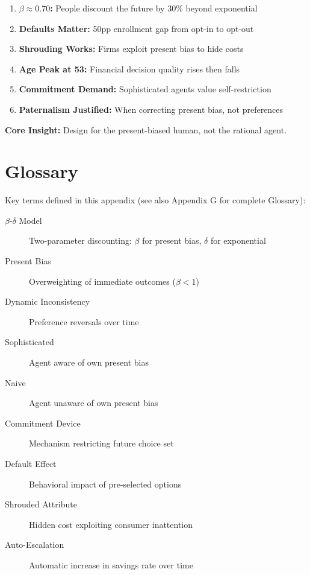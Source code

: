 \begin{tcolorbox}[colback=gray!10!white,colframe=gray!50!black,title=Key Takeaways]
\begin{enumerate}
    \item \textbf{$\beta \approx 0.70$:} People discount the future by 30\% beyond exponential
    \item \textbf{Defaults Matter:} 50pp enrollment gap from opt-in to opt-out
    \item \textbf{Shrouding Works:} Firms exploit present bias to hide costs
    \item \textbf{Age Peak at 53:} Financial decision quality rises then falls
    \item \textbf{Commitment Demand:} Sophisticated agents value self-restriction
    \item \textbf{Paternalism Justified:} When correcting present bias, not preferences
\end{enumerate}

\textbf{Core Insight:} Design for the present-biased human, not the rational agent.
\end{tcolorbox}

\section{Glossary}

Key terms defined in this appendix (see also Appendix G for complete Glossary):

\begin{description}
    \item[$\beta$-$\delta$ Model] Two-parameter discounting: $\beta$ for present bias, $\delta$ for exponential
    \item[Present Bias] Overweighting of immediate outcomes ($\beta < 1$)
    \item[Dynamic Inconsistency] Preference reversals over time
    \item[Sophisticated] Agent aware of own present bias
    \item[Naive] Agent unaware of own present bias
    \item[Commitment Device] Mechanism restricting future choice set
    \item[Default Effect] Behavioral impact of pre-selected options
    \item[Shrouded Attribute] Hidden cost exploiting consumer inattention
    \item[Auto-Escalation] Automatic increase in savings rate over time
\end{description}

